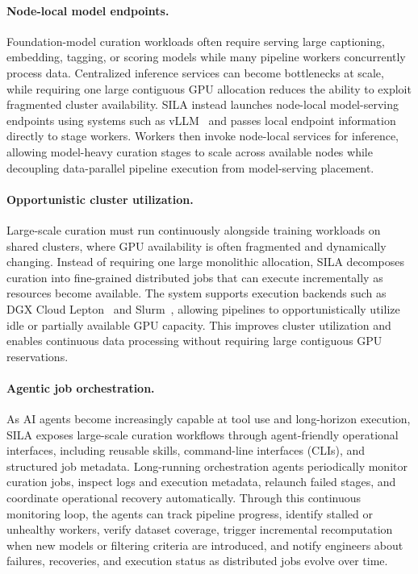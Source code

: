 \paragraph{Node-local model endpoints.}
Foundation-model curation workloads often require serving large captioning, embedding, tagging, or scoring models while many pipeline workers concurrently process data. Centralized inference services can become bottlenecks at scale, while requiring one large contiguous GPU allocation reduces the ability to exploit fragmented cluster availability. SILA instead launches node-local model-serving endpoints using systems such as vLLM~\citep{vllm} and passes local endpoint information directly to stage workers. Workers then invoke node-local services for inference, allowing model-heavy curation stages to scale across available nodes while decoupling data-parallel pipeline execution from model-serving placement.

\paragraph{Opportunistic cluster utilization.}
Large-scale curation must run continuously alongside training workloads on shared clusters, where GPU availability is often fragmented and dynamically changing. Instead of requiring one large monolithic allocation, SILA decomposes curation into fine-grained distributed jobs that can execute incrementally as resources become available. The system supports execution backends such as DGX Cloud Lepton~\citep{nvidia2026dgxcloudlepton} and Slurm~\citep{jette2023slurmarchitecture}, allowing pipelines to opportunistically utilize idle or partially available GPU capacity. This improves cluster utilization and enables continuous data processing without requiring large contiguous GPU reservations.

\paragraph{Agentic job orchestration.}
As AI agents become increasingly capable at tool use and long-horizon execution, SILA exposes large-scale curation workflows through agent-friendly operational interfaces, including reusable skills, command-line interfaces (CLIs), and structured job metadata. Long-running orchestration agents periodically monitor curation jobs, inspect logs and execution metadata, relaunch failed stages, and coordinate operational recovery automatically. Through this continuous monitoring loop, the agents can track pipeline progress, identify stalled or unhealthy workers, verify dataset coverage, trigger incremental recomputation when new models or filtering criteria are introduced, and notify engineers about failures, recoveries, and execution status as distributed jobs evolve over time.

